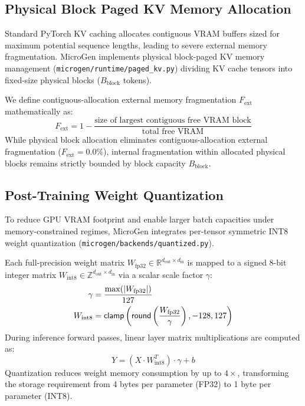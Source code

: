 \subsection{Physical Block Paged KV Memory Allocation}
\label{sec:opt_paged_kv}

Standard PyTorch KV caching allocates contiguous VRAM buffers sized for maximum potential sequence lengths, leading to severe external memory fragmentation. \textsf{MicroGen} implements physical block-paged KV memory management (\texttt{microgen/runtime/paged\_kv.py}) dividing KV cache tensors into fixed-size physical blocks ($B_{\text{block}}$ tokens).

We define contiguous-allocation external memory fragmentation $F_{\text{ext}}$ mathematically as:
\begin{equation}
    F_{\text{ext}} = 1 - \frac{\text{size of largest contiguous free VRAM block}}{\text{total free VRAM}}
\end{equation}
While physical block allocation eliminates contiguous-allocation external fragmentation ($F_{\text{ext}} = 0.0\%$), internal fragmentation within allocated physical blocks remains strictly bounded by block capacity $B_{\text{block}}$.

\subsection{Post-Training Weight Quantization}
\label{sec:opt_quant}

To reduce GPU VRAM footprint and enable larger batch capacities under memory-constrained regimes, \textsf{MicroGen} integrates per-tensor symmetric INT8 weight quantization (\texttt{microgen/backends/quantized.py}).

Each full-precision weight matrix $W_{\text{fp32}} \in \mathbb{R}^{d_{\text{out}} \times d_{\text{in}}}$ is mapped to a signed 8-bit integer matrix $W_{\text{int8}} \in \mathbb{Z}^{d_{\text{out}} \times d_{\text{in}}}$ via a scalar scale factor $\gamma$:
\begin{align}
    \gamma &= \frac{\max(|W_{\text{fp32}}|)}{127} \\
    W_{\text{int8}} &= \text{\textsf{clamp}}\left(\text{\textsf{round}}\left(\frac{W_{\text{fp32}}}{\gamma}\right), -128, 127\right)
\end{align}
During inference forward passes, linear layer matrix multiplications are computed as:
\begin{equation}
    Y = \left(X \cdot W_{\text{int8}}^T\right) \cdot \gamma + b
\end{equation}
Quantization reduces weight memory consumption by up to $4\times$, transforming the storage requirement from 4 bytes per parameter (FP32) to 1 byte per parameter (INT8).


